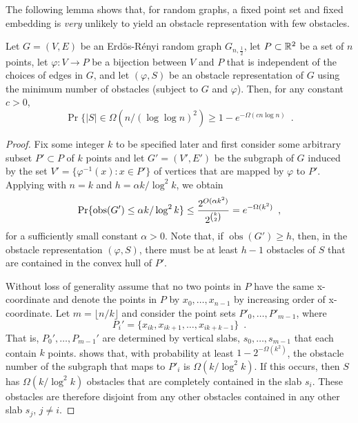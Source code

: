 \documentclass{patmorin}
\DeclareMathOperator{\obs}{obs}
\begin{document}
The following lemma shows that, for random graphs, a fixed point
set and fixed embedding is \emph{very} unlikely to yield an obstacle
representation with few obstacles.

\begin{lem}
  Let $G=(V,E)$ be an Erd\"os-R\'enyi random graph $G_{n,\frac{1}{2}}$,
  let $P\subset\mathbb{R}^2$ be a set of $n$ points, let
  $\varphi:V\rightarrow P$ be a bijection between $V$ and $P$ that is
  independent of the choices of edges in $G$, and let $(\varphi, S)$ be
  an obstacle representation of $G$ using the minimum number of obstacles
  (subject to $G$ and $\varphi$).  Then, for any constant $c>0$,
  \[
     \Pr\{|S| \in \Omega(n/(\log\log n)^2) \ge 1-e^{-\Omega(cn\log n)}  \enspace .
  \] 
\end{lem}

\begin{proof}
Fix some integer $k$ to be specified later and first consider some
arbitrary subset $P'\subset P$ of $k$ points and let $G'=(V',E')$
be the subgraph of $G$ induced by the set $V'=\{\varphi^{-1}(x):x\in
P'\}$ of vertices that are mapped by $\varphi$ to $P'$.  Applying
 with $n=k$ and $h=\alpha k/\log^2 k$, we obtain
\begin{equation}
     \Pr\{\obs(G') \le \alpha k/\log^2 k\} 
       \le \frac{2^{O(\alpha k^2)}}{2^{\binom{k}{2}}}
       = e^{-\Omega(k^2)} \enspace , \eqlabel{g1}
\end{equation}
for a sufficiently small constant $\alpha > 0$.  Note that, if
$\obs(G')\ge h$, then, in the obstacle representation $(\varphi,S)$,
there must be at least $h-1$ obstacles of $S$ that are contained in the
convex hull of $P'$.

Without loss of generality assume that no two points in $P$ have the
same x-coordinate and denote the points in $P$ by $x_0,\ldots,x_{n-1}$
by increasing order of x-coordinate.  Let $m=\lfloor n/k\rfloor$ and
consider the point sets $P'_0,\ldots,P'_{m-1}$, where
\[ 
  P_i'=\{x_{ik},x_{ik+1},\ldots,x_{ik+k-1}\} \enspace .
\]  
That is, $P_0',\ldots,P_{m-1}'$ are determined by vertical slabs,
$s_0,\ldots,s_{m-1}$ that each contain $k$ points.   shows
that, with probability at least $1-2^{-\Omega(k^2)}$, the obstacle number
of the subgraph that maps to $P'_i$ is $\Omega(k/\log^2 k)$.  If this
occurs, then $S$ has $\Omega(k/\log^2 k)$ obstacles that are completely
contained in the slab $s_i$.  These obstacles are therefore disjoint
from any other obstacles contained in any other slab $s_j$, $j\neq i$.


\end{proof}
\end{document}
